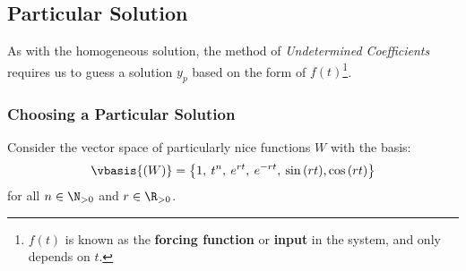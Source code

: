 \documentclass{article}
\begin{document}
\subsection{Particular Solution}
As with the homogeneous solution, the method of \emph{Undetermined Coefficients}
requires us to guess a solution \(y_p\) based on the form of \(f\left( t \right)\)\footnote{\(f\left( t \right)\) is known as the
    \textbf{forcing function} or \textbf{input} in the system, and only depends on \(t\).}.
\subsubsection{Choosing a Particular Solution}
Consider the vector space of particularly nice functions \(W\) with the basis:
\begin{equation*}
    \vbasis{\left( W \right)} = \left\{ 1,\: t^n,\: e^{r t},\: e^{-r t},\: \sin{\left( r t \right)}, \cos{\left( r t \right)} \right\}
\end{equation*}
for all \(n \in \N_{>0}\) and \(r \in \R_{>0}\).
\end{document}
